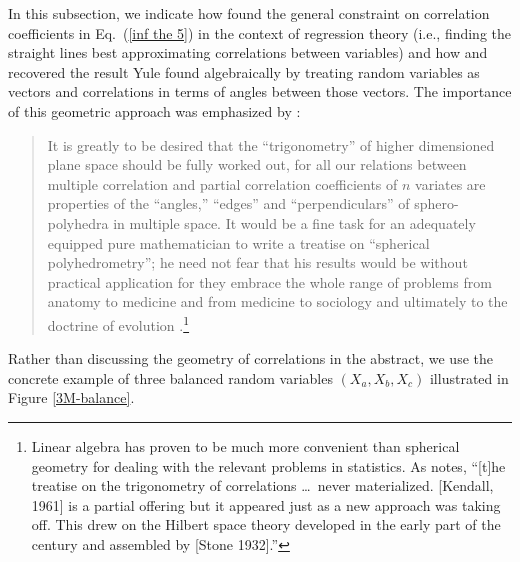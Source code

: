 In this subsection, we indicate how \citet{Yule 1896} found the general constraint on correlation coefficients in Eq.\ (\ref{inf the 5}) in the context of regression theory (i.e., finding the straight lines best approximating correlations between variables) and how \citet{Fisher 1915,Fisher 1924} and \citet{De Finetti 1937} recovered the result Yule found algebraically by treating random variables as vectors and correlations in terms of angles between those vectors. The importance of this geometric approach was emphasized by \citet{Pearson 1916}:
\begin{quote}
It is greatly to be desired that the ``trigonometry'' of higher dimensioned plane space should be fully worked out, for all our relations between multiple correlation and partial correlation coefficients of $n$ variates are properties of the ``angles,'' ``edges'' and ``perpen\-diculars'' of sphero-polyhedra in multiple space. It would be a fine task for an adequately equipped pure mathematician to write a treatise on ``spherical polyhedrometry''; he need not fear that his results would be without practical application for they embrace the whole range of problems from anatomy to medicine and from medicine to sociology and ultimately to the doctrine of evolution \citep[p.\ 237]{Pearson 1916}.\footnote{Linear algebra has proven to be much more convenient than spherical geometry for dealing with the relevant problems in statistics. As \citet[p.\ 73]{Aldrich 1998} notes, ``[t]he treatise on the trigonometry of correlations \ldots\ never materialized. [Kendall, 1961] is a partial offering but it appeared just as a new approach was taking off. This drew on the Hilbert space theory developed in the early part of the century and assembled by [Stone 1932].''}
\end{quote}
Rather than discussing the geometry of correlations in the abstract, we use the concrete example of three balanced random variables $(X_a, X_b, X_c)$ illustrated in Figure \ref{3M-balance}. 

